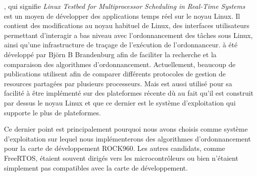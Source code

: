 \litmus, qui signifie \textit{Linux Testbed for Multiprocessor Scheduling in Real-Time Systems} est un moyen de développer des applications temps réel sur le noyau Linux. Il contient des modifications au noyau habituel de Linux, des interfaces utilisateurs permettant d'interagir a bas niveau avec l'ordonnancement des tâches sous Linux, ainsi qu'une infrastructure de traçage de l'exécution de l'ordonnanceur.
\litmus à été développé par Björn B Brandenburg \cite{brandenburg2011scheduling} afin de faciliter la recherche et la comparaison des algorithmes d'ordonnancement. Actuellement, beaucoup de publications utilisent \litmus afin de comparer différents protocoles de gestion de resources partagées par plusieurs processeurs. Mais \litmus est aussi utilisé pour sa facilité à être implémenté sur des plateformes récente dù au fait qu'il est construit par dessus le noyau Linux et que ce dernier est le système d'exploitation qui supporte le plus de plateformes. 

Ce dernier point est principalement pourquoi nous avons choisis \litmus comme système d'exploitation sur lequel nous implémenterons des algorithmes d'ordonnancement pour la carte de développement ROCK960. Les autres candidats, comme FreeRTOS, étaient souvent dirigés vers les microcontrôleurs ou bien n'étaient simplement pas compatibles avec la carte de développement. 

